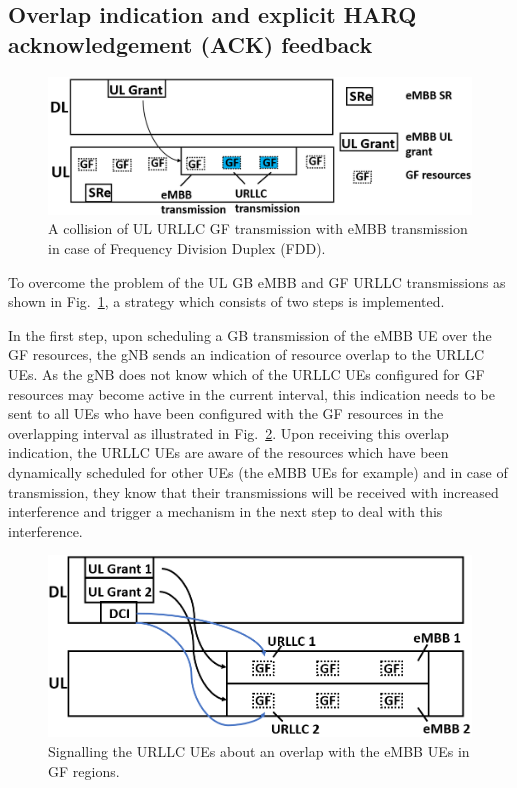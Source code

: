 \documentclass[conference]{IEEEtran}
\begin{document}
\subsection{Overlap indication and explicit HARQ acknowledgement (ACK) feedback}\label{IIAA}
\begin{figure}[htbp]
\centerline{\includegraphics[scale=0.25]{fig1.PNG}}
\caption{A collision of UL URLLC GF transmission with eMBB transmission in case of Frequency Division Duplex (FDD).}
\label{fig1}

\end{figure}
To overcome the problem of the UL GB eMBB and GF URLLC transmissions as shown in Fig.~\ref{fig1}, a strategy which consists of two steps is implemented. 

In the first step, upon scheduling a GB transmission of the eMBB UE over the GF resources, the gNB sends an indication of resource overlap to the URLLC UEs. As the gNB does not know which of the URLLC UEs configured for GF resources may become active in the current interval, this indication needs to be sent to all UEs who have been configured with the GF resources in the overlapping interval as illustrated in Fig.~\ref{fig2}. Upon receiving this overlap indication, the URLLC UEs are aware of the resources which have been dynamically scheduled for other UEs (the eMBB UEs for example) and in case of transmission, they know that their transmissions will be received with increased interference and trigger a mechanism in the next step to deal with this interference.

\begin{figure}[htbp]
\centerline{\includegraphics[scale=0.2]{fig2.PNG}}
\caption{Signalling the URLLC UEs about an overlap with the eMBB UEs in GF regions.}
\label{fig2}
\vspace{-2mm}
\end{figure}
\end{document}
